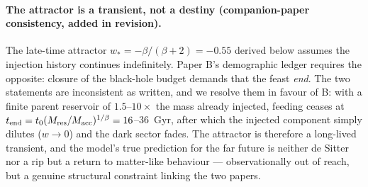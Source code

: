 \documentclass[11pt]{article}
\begin{document}
\paragraph{The attractor is a transient, not a destiny (companion-paper consistency, added in revision).}
The late-time attractor $w_* = -\beta/(\beta+2) = -0.55$ derived below assumes the injection history
continues indefinitely. Paper B's demographic ledger requires the opposite: closure of the
black-hole budget demands that the feast \emph{end}. The two statements are inconsistent as written,
and we resolve them in favour of B: with a finite parent reservoir of $1.5$--$10\times$ the mass
already injected, feeding ceases at $t_{\rm end} = t_0 (M_{\rm res}/M_{\rm acc})^{1/\beta} = 16$--$36$~Gyr,
after which the injected component simply dilutes ($w \to 0$) and the dark sector fades. The attractor
is therefore a long-lived transient, and the model's true prediction for the far future is neither de
Sitter nor a rip but a return to matter-like behaviour --- observationally out of reach, but a genuine
structural constraint linking the two papers.
\end{document}
